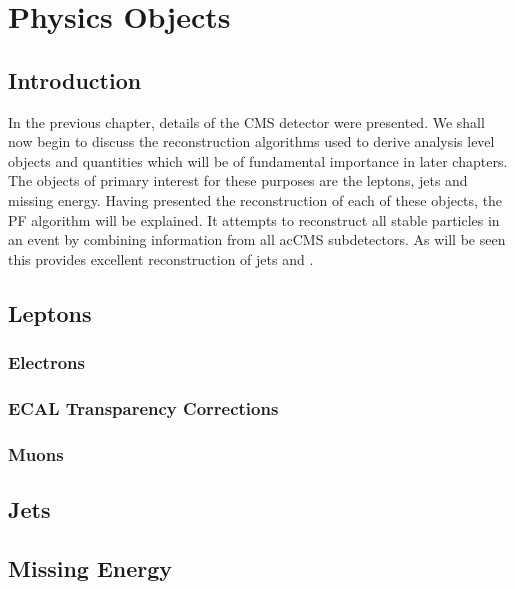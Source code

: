 \chapter{Physics Objects}
\section{Introduction}
In the previous chapter, details of the \ac{CMS} detector were presented. We
shall now begin to discuss the reconstruction algorithms used to derive analysis
level objects and quantities which will be of fundamental importance in later
chapters. The objects of primary interest for these purposes are the leptons,
jets and missing energy. Having presented the reconstruction of each of these
objects, the \acl{PF} algorithm will be explained. It attempts to reconstruct
all stable particles in an event by combining information from all ac{CMS}
subdetectors. As will be seen this provides excellent reconstruction of jets and
\MET.

\section{Leptons}
\subsection{Electrons}
\subsection{\ac{ECAL} Transparency Corrections}
\label{sec:reco_ecal_transparency}
\subsection{Muons}
\section{Jets}
\section{Missing Energy}

